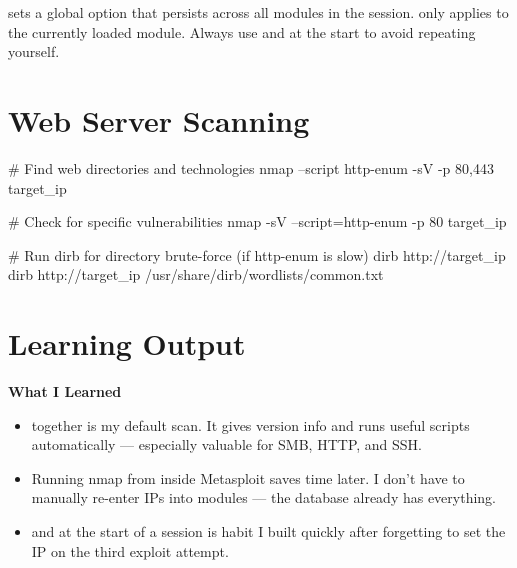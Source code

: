 \begin{notebox}


\begin{notebox}
 sets a global option that persists across all modules in the session.
 only applies to the currently loaded module. Always use 
and  at the start to avoid repeating yourself.
\end{notebox}

\section{Web Server Scanning}
\label{sec:web_scanning}

\begin{termbox}
# Find web directories and technologies
nmap --script http-enum -sV -p 80,443 target_ip

# Check for specific vulnerabilities
nmap -sV --script=http-enum -p 80 target_ip

# Run dirb for directory brute-force (if http-enum is slow)
dirb http://target_ip
dirb http://target_ip /usr/share/dirb/wordlists/common.txt
\end{termbox}


\section{Learning Output}
\label{sec:scanning_learning}

\begin{takebox}
\textbf{What I Learned}
\begin{itemize}
  \item {} together is my default scan. It gives version info and runs
        useful scripts automatically --- especially valuable for SMB, HTTP, and SSH.
  \item Running nmap from inside Metasploit saves time later. I don't have to
        manually re-enter IPs into modules --- the database already has everything.
  \item {} and  at the start of a session is habit I
        built quickly after forgetting to set the IP on the third exploit attempt.
\end{itemize}


\end{takebox}
\end{notebox}
